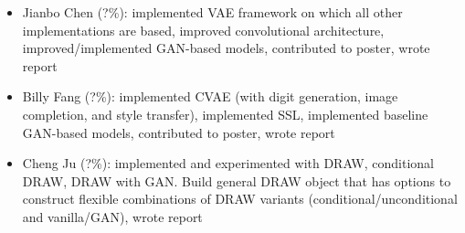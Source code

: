 \documentclass[10pt]{article}
\begin{document}
\begin{itemize}
\item Jianbo Chen (?\%): implemented VAE framework on which all other implementations are based, improved convolutional architecture, improved/implemented GAN-based models, contributed to poster, wrote report
\item Billy Fang (?\%): implemented CVAE (with digit generation, image completion, and style transfer), implemented SSL, implemented baseline GAN-based models, contributed to poster, wrote report
\item Cheng Ju (?\%): implemented and experimented with DRAW, conditional DRAW, DRAW with GAN. Build general DRAW object that has options to construct flexible combinations of DRAW variants (conditional/unconditional and vanilla/GAN), wrote report
\end{itemize}















\nocite{*}
\end{document}
